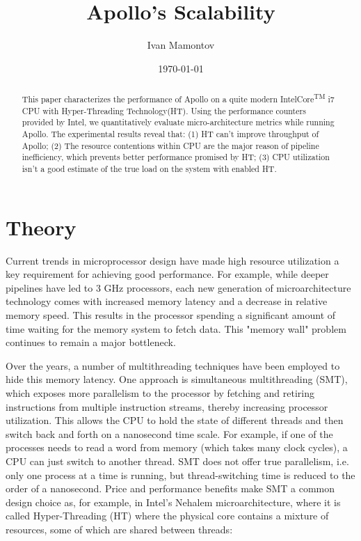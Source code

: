 \documentclass[12pt]{article}
\title{Apollo's Scalability}
\date{\today}
\author{Ivan Mamontov}
\begin{document}
\maketitle

\tableofcontents{}

\begin{abstract}

This paper characterizes the performance of Apollo on a quite modern Intel\circledR Core\textsuperscript{TM} i7 CPU with Hyper-Threading Technology(HT). Using the performance counters provided by Intel, we quantitatively evaluate micro-architecture metrics while running Apollo. The experimental results reveal that: (1) HT can't improve throughput of Apollo; (2) The resource contentions within CPU are the major reason of pipeline inefficiency, which prevents better performance promised by HT; (3) CPU utilization isn't a good estimate of the true load on the system with enabled HT.

\end{abstract}

\section{Theory}

Current trends in microprocessor design have made high resource utilization a key requirement for achieving good performance. For example, while deeper pipelines have led to 3 GHz processors, each new generation of microarchitecture technology comes with increased memory latency and a decrease in relative memory speed. This results in the processor spending a significant amount of time waiting for the memory system to fetch data. This "memory wall" problem continues to remain a major bottleneck\cite{impact}.

Over the years, a number of multithreading techniques have been employed to hide this memory latency. One approach is simultaneous multithreading (SMT), which exposes more parallelism to the processor by fetching and retiring instructions from multiple instruction streams, thereby increasing processor utilization. This allows the CPU to hold the state of different threads and then switch back and forth on a nanosecond time scale. For example, if one of the processes needs to read a word from memory (which takes many clock cycles), a CPU can just switch to another thread. SMT does not offer true parallelism, i.e. only one process at a time is running, but thread-switching time is reduced to the order of a nanosecond\cite{tanenbaum}. Price and performance benefits make SMT a common design choice as, for example, in Intel's Nehalem microarchitecture, where it is called Hyper-Threading (HT) where the physical core contains a mixture of resources, some of which are shared between threads\cite{intel}:
\end{document}
